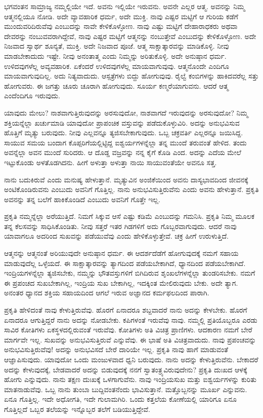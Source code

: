 ಭಗವಂತನ ಸಾಮ್ರಾಜ್ಯ ನಮ್ಮಲ್ಲಿಯೇ ಇದೆ. ಅವನು ಇಲ್ಲಿಯೇ ಇರುವನು. ಅವನೇ ಎಲ್ಲರ ಆತ್ಮ. ಅವನನ್ನು ನಿಮ್ಮ ಆತ್ಮನಲ್ಲಿಯೂ ನೋಡಿ. ಅದೇ ವ್ಯಾವಹಾರಿಕ ಧರ್ಮ, ಅದೇ ಮುಕ್ತಿ. ನಾವು ಎಷ್ಟರ ಮಟ್ಟಿಗೆ ಆ ಗುರಿಯ ಕಡೆಗೆ ಮುಂದುವರಿದಿರುವೆವು ಎಂಬುದನ್ನು ನಾವೇ ಕೇಳಿಕೊಳ್ಳೋಣ. ನಾವು ಎಷ್ಟು ಮಟ್ಟಿಗೆ ದೇಹಾರಾಧಕರು ಅಥವಾ ದೇವರನ್ನು ನಂಬುವವರಾಗಿದ್ದೇವೆ, ನಾವು ಎಷ್ಟರ ಮಟ್ಟಿಗೆ ಆತ್ಮನನ್ನು ನಂಬುತ್ತೇವೆ ಎಂಬುದನ್ನು ಕೇಳಿಕೊಳ್ಳೋಣ. ಅದೇ ನಿಜವಾದ ಸ್ವಾರ್ಥ ಶೂನ್ಯತೆ, ಮುಕ್ತಿ. ಅದೇ ನಿಜವಾದ ಪೂಜೆ. ಆತ್ಮ ಸಾಕ್ಷಾತ್ಕಾರವನ್ನು ಮಾಡಿಕೊಳ್ಳಿ. ನೀವು ಮಾಡಬೇಕಾದುದು ಇಷ್ಟೇ. ನೀವು ಅನಂತಾತ್ಮ ಎಂದು ನಿಮ್ಮನ್ನು ಅರಿತುಕೊಳ್ಳಿ. ಅದೇ ಅನುಷ್ಠಾನ ಧರ್ಮ. ಉಳಿದವುಗಳೆಲ್ಲ ಅವ್ಯವಹಾರಿಕ. ಏಕೆಂದರೆ ಉಳಿದವುಗಳೆಲ್ಲ ಮಾಯವಾಗುವುವು. ಆತ್ಮನೊಂದೇ ಎಂದಿಗೂ ಮಾಯವಾಗುವುದಿಲ್ಲ. ಅದು ನಿತ್ಯವಾದುದು. ಆಸ್ಪತ್ರೆಗಳು ಬಿದ್ದು ಹೋಗುವುವು. ರೈಲ್ವೆ ಕಂಬಿಗಳನ್ನು ಹಾಕಿದವರೆಲ್ಲ ಸತ್ತು ಹೋಗುವರು. ಈ ಜಗತ್ತು ಚೂರು ಚೂರಾಗಿ ಹೋಗುವುದು. ಸೂರ್ಯ ಕಣ್ಮರೆಯಾಗುವನು. ಆದರೆ ಆತ್ಮ ಎಂದೆಂದಿಗೂ ಇರುವುದು.

ಯಾವುದು ಮೇಲು? ನಾಶವಾಗುತ್ತಿರುವುದನ್ನು ಅರಸುವುದೋ, ನಾಶವಾಗದೆ ಇರುವುದನ್ನು ಅರಸುವುದೋ? ನಿಮ್ಮ ಶಕ್ತಿಯನ್ನೆಲ್ಲಾ ಖರ್ಚುಮಾಡಿ ಯಾವುದೋ ಪ್ರಾಪಂಚಿಕ ವಸ್ತುವನ್ನು ಪಡೆದುಕೊಳ್ಳುವಿರಿ. ಅದನ್ನು ಅನುಭವಿಸುವ ಹೊತ್ತಿಗೆ ಮೃತ್ಯು ಬರುವುದು. ನೀವು ಎಲ್ಲವನ್ನೂ ತ್ಯಜಿಸಬೇಕಾಗುವುದು. ಒಬ್ಬ ಚಕ್ರವರ್ತಿ ಎಲ್ಲರನ್ನೂ ಜಯಿಸಿದ್ದ. ಸಾಯುವ ಸಮಯ ಬಂದಾಗ ಕೊಪ್ಪರಿಗೆಯಲ್ಲಿಟ್ಟಿದ್ದ ಐಶ್ವರ್ಯಗಳನ್ನೆಲ್ಲಾ ತನ್ನ ಮುಂದೆ ತರುವಂತೆ ಹೇಳಿದ. ತಂದು ಅವನ್ನೆಲ್ಲಾ ಅವನ ಮುಂದೆ ಸುರಿದರು. ಆ ದೊಡ್ಡ ವಜ್ರವನ್ನು ನನ್ನ ಕೈಗೆ ಕೊಡಿ ಎಂದ. ಅದನ್ನು ಎದೆಯ ಮೇಲೆ ಇಟ್ಟುಕೊಂಡು ಅಳತೊಡಗಿದನು. ಹೀಗೆ ಅಳುತ್ತಾ ಅಳುತ್ತಾ ನಾಯಿ ಸಾಯುವಂತೆಯೇ ಅವನೂ ಸತ್ತ.

ನಾನು ಬದುಕಿರುವೆ ಎಂದು ಮನುಷ್ಯ ಹೇಳುತ್ತಾನೆ. ಮೃತ್ಯುವಿನ ಅಂಜಿಕೆಯಿಂದ ಅವನು ದಾಸ್ಯಭಾವದಿಂದ ಜೀವನಕ್ಕೆ ಅಂಟಿಕೊಂಡಿರುವನು ಎಂಬುದು ಅವನಿಗೆ ಗೊತ್ತಿಲ್ಲ. ನಾನು ಅನುಭವಿಸುತ್ತಿರುವೆನು ಎಂದು ಅವನು ಹೇಳುತ್ತಾನೆ. ಪ್ರಕೃತಿ ಅವನನ್ನು ತನ್ನ ಬಲೆಗೆ ಹಾಕಿಕೊಂಡಿದೆ ಎಂಬುದು ಅವನಿಗೆ ಗೊತ್ತೇ ಇಲ್ಲ.

ಪ್ರಕೃತಿ ನಮ್ಮನ್ನೆಲ್ಲಾ ಅರೆಯುತ್ತಿದೆ. ನಿಮಗೆ ಸಿಕ್ಕುವ ಆಸೆ ಎಷ್ಟು ಕಡಿಮೆ ಎಂಬುದನ್ನು ಗಮನಿಸಿ. ಪ್ರಕೃತಿ ನಿಮ್ಮ ಮೂಲಕ ತನ್ನ ಕೆಲಸವನ್ನು ಸಾಧಿಸಿಕೊಂಡಿತು. ನೀವು ಸತ್ತರೆ ಇತರ ಗಿಡಗಳಿಗೆ ಅದು ಗೊಬ್ಬರವಾಗುವುದು. ಆದರೆ ನಾವು ಯಾವಾಗಲೂ ಅದರಿಂದ ಸುಖವನ್ನು ಪಡೆಯುವೆವು ಎಂದು ಹೇಳಿಕೊಳ್ಳುತ್ತೇವೆ. ಚಕ್ರ ಹೀಗೆ ಉರುಳುತ್ತಿದೆ.

ಆತ್ಮನನ್ನು ಆತ್ಮನಂತೆ ಅರಿಯುವುದೇ ಅನುಷ್ಠಾನ ಧರ್ಮ. ಈ ಆದರ್ಶದೆಡೆಗೆ ಹೋಗುವುದಕ್ಕೆ ನಮಗೆ ಸಹಾಯ ಮಾಡುವುದೆಲ್ಲ ಒಳ್ಳೆಯದೆ. ಈ ಸಾಕ್ಷಾತ್ಕಾರವನ್ನು ತ್ಯಾಗದಿಂದ ಪಡೆಯಬೇಕಾಗಿದೆ, ಧ್ಯಾನದಿಂದ ಪಡೆಯಬೇಕಾಗಿದೆ. ಇಂದ್ರಿಯಗಳನ್ನೆಲ್ಲಾ ತ್ಯಜಿಸಬೇಕು, ನಮ್ಮನ್ನು ಭೌತವಸ್ತುಗಳಿಗೆ ಬಿಗಿದಿರುವ ಶೃಂಖಲೆಗಳನ್ನೆಲ್ಲಾ ತುಂಡರಿಸಬೇಕು. ನಮಗೆ ಈ ಪ್ರಪಂಚದ ಸುಖಬೇಕಾಗಿಲ್ಲ, ಇಂದ್ರಿಯ ಸುಖ ಬೇಕಾಗಿಲ್ಲ, ಇದಕ್ಕಿಂತ ಮೇಲಿರುವುದು ಬೇಕು. ಅದೇ ತ್ಯಾಗ. ಅನಂತರ ಧ್ಯಾನದ ಶಕ್ತಿಯ ಸಹಾಯದಿಂದ ಆಗಲೆ ಇರುವ ಅಜ್ಞಾನದ ಕರ್ಮಫಲದಿಂದ ಪಾರಾಗಿ.

ಪ್ರಕೃತಿ ಹೇಳಿದಂತೆ ನಾವು ಕೇಳುತ್ತಿರುವೆವು. ಹೊರಗೆ ಏನಾದರೂ ಶಬ್ದವಾದರೆ ನಾನು ಅದನ್ನು ಕೇಳಬೇಕು. ಹೊರಗೆ ಏನಾದರೂ ಆಗುತ್ತಿದ್ದರೆ ನಾನು ಅದನ್ನು ನೋಡಬೇಕು. ಕಪಿಗಳಂತೆ ಇರುವೆವು ನಾವು. ನಮ್ಮಲ್ಲಿ ಪ್ರತಿಯೊಬ್ಬರೂ ಎರಡು ಸಾವಿರ ಕೋತಿಗಳು ಏಕಸ್ಥಳದಲ್ಲಿರುವಂತೆ ಇರುವೆವು. ಕೋತಿಗಳು ಅತಿ ವಿಚಿತ್ರ ಪ್ರಾಣಿಗಳು. ಆದಕಾರಣ ನಮಗೆ ಬೇರೆ ಮಾರ್ಗವೇ ಇಲ್ಲ. ಸುಖವನ್ನು ಅನುಭವಿಸುತ್ತಿರುವೆ ಎನ್ನುವೆವು. ಈ ಭಾಷೆ ಅತಿ ವಿಚಿತ್ರವಾದುದು. ನಾವು ಪ್ರಪಂಚವನ್ನು ಅನುಭವಿಸುತ್ತಿರುವೆವು! ಅದನ್ನು ಅನುಭವಿಸದೆ ಬೇರೆ ದಾರಿಯೇ ಇಲ್ಲ. ಪ್ರಕೃತಿ ನಾವು ಹಾಗೆ ಮಾಡುವಂತೆ ಆಜ್ಞಾಪಿಸುವುದು. ಯಾವುದೋ ಒಂದು ಮಂಜುಳವಾದ ಧ್ವನಿ ಬರುವುದು. ನಾನು ಅದನ್ನು ಕೇಳುತ್ತಿರುವೆನು. ಬೇಕಾದರೆ ಅದನ್ನು ಕೇಳುವುದಕ್ಕೆ, ಬೇಡವಾದರೆ ಅದನ್ನು ಬಿಡುವುದಕ್ಕೆ ನನಗೆ ಸ್ವಾತಂತ್ರ್ಯವಿರುವುದೇನು? ಪ್ರಕೃತಿ ದುಃಖದ ಆಳಕ್ಕೆ ಹೋಗು ಎನ್ನುವುದು. ನಾನು ತಕ್ಷಣ ದುಃಖಕ್ಕೆ ಒಳಗಾಗುವೆನು. ನಾವು ಇಂದ್ರಿಯಸುಖ ಮತ್ತು ಐಶ್ವರ್ಯಗಳನ್ನು ಕುರಿತು ಮಾತನಾಡುವೆವು. ಒಬ್ಬ ನಾನು ತುಂಬಾ ಬುದ್ದಿವಂತನೆಂದು ಭಾವಿಸುತ್ತಾನೆ. ಮತ್ತೊಬ್ಬನನ್ನು ಮೂರ್ಖ ಎನ್ನುವನು. ಏನೂ ಗೊತ್ತಿಲ್ಲ. ಇದೇ ಅಧೋಗತಿ, ಇದೇ ಗುಲಾಮಗಿರಿ. ಒಂದು ಕತ್ತಲೆಯ ಕೋಣೆಯಲ್ಲಿ ಯಾರಿಗೂ ಏನೂ ಗೊತ್ತಿಲ್ಲದೆ ಒಬ್ಬರ ತಲೆಯನ್ನು ಇನ್ನೊಬ್ಬರ ತಲೆಗೆ ಬಡಿಯುತ್ತಿದ್ದೇವೆ.

